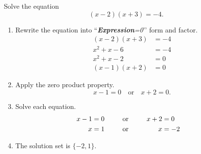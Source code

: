 \begin{multicols}{2}
		\begin{example}
			Solve the equation
			\[(x-2)(x+3)=-4.\]
		\end{example}
		\begin{solution}
			\begin{enumerate}[label={\textbf{\textup{Step \arabic*.}}~}]
				\item Rewrite the equation into ``\textit{\textbf{Expression}=0}\rq\rq{} form and factor.
				      \[
						  \begin{split}(x-2)(x+3)&=-4\\
						      x^2+x-6&=-4\\
						      x^2+x-2&=0\\
						      (x-1)(x+2)&=0
					      \end{split}
				      \]
				\item Apply the zero product property.
				      \[x-1=0\quad\text{or}\quad x+2=0.\]
				\item Solve each equation.
				      \begin{alignat*}{3}
					      x-1 & =0 &  & \ctc{or} & x+2 & =0  \\
					      x   & =1 &  & \ctc{or} & x   & =-2
				      \end{alignat*}
				\item The solution set is $\{-2, 1\}$.
			\end{enumerate}
		\end{solution}
	\end{multicols}

